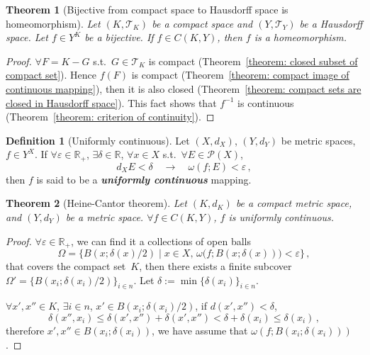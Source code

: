 \documentclass[openany]{book}
\newcommand*{\indexbf}[1]{\emph{\textbf{#1}}\index{#1}} %
\theoremstyle{plain}
\newtheorem{theorem}{Theorem}[section] %
\theoremstyle{definition}
\newtheorem{definition}{Definition}[section] %
\begin{document}
\begin{theorem}[Bijective from compact space to Hausdorff space is homeomorphism]
		\label{theorem: bijective from compact space to Hausdorff space is homeomorphism}
	Let $(K, \mathscr T_K)$ be a compact space and $(Y, \mathscr T_Y)$ be a Hausdorff space. 
	Let $f \in Y^K$ be a bijective.
	If $f \in C(K, Y)$, then $f$ is a homeomorphism.
\end{theorem}
\begin{proof}
	$\forall F = K - G$ s.t.\ $G \in \mathscr T_K$ is compact (Theorem~\ref{theorem: closed subset of compact set}). 
	Hence $f(F)$ is compact (Theorem~\ref{theorem: compact image of continuous mapping}), then it is also closed
	(Theorem~\ref{theorem: compact sets are closed in Hausdorff space}). 
	This fact shows that $f^{-1}$ is continuous (Theorem~\ref{theorem: criterion of continuity}).
\end{proof}

\begin{definition}[Uniformly continuous]
	Let $(X, d_X)$, $(Y, d_Y)$ be metric spaces, $f \in Y^X$.
	If $\forall \varepsilon \in \mathbb R_+$, $\exists \delta \in \mathbb R$, $\forall x \in X$ s.t.\ $\forall E \in \mathscr P(X)$, 
	\begin{equation*}
		d_X E < \delta 
		\quad \to \quad
		\omega(f; E) < \varepsilon\,,
	\end{equation*}
	then $f$ is said to be a \indexbf{uniformly continuous} mapping.
\end{definition}

\begin{theorem}[Heine-Cantor theorem]
	\label{theorem: Heine-Cantor}
	Let $(K, d_K)$ be a compact metric space, and $(Y, d_Y)$ be a metric space.
	$\forall f \in C(K, Y)$, $f$ is uniformly continuous.
\end{theorem}
\begin{proof}
	$\forall \varepsilon \in \mathbb R_+$, we can find it a collections of open balls
	\begin{equation*}
		\varOmega = \big\{B(x; \delta(x)/2) \mid
			 x \in X,\, \omega\big(f; B(x; \delta(x))\big) < \varepsilon \big\}\,,
	\end{equation*}
	that covers the compact set~$K$, then there exists a finite subcover $\varOmega' = \big\{B(x_i; \delta(x_i)/2)\big\}_{i \in n}$. Let $\delta := \min \{\delta(x_i)\}_{i \in n}$.
	
	$\forall x', x'' \in K$, $\exists i \in n$, $x' \in B(x_i; \delta(x_i)/2)$, if $d(x', x'') < \delta$, 
	\begin{equation*}
		\delta(x'', x_i) \leq \delta(x', x'') + \delta(x', x'') < \delta + \delta(x_i) \leq \delta(x_i)\,,
	\end{equation*}
	therefore $x', x'' \in B(x_i; \delta(x_i))$, we have assume that $\omega(f; B(x_i; \delta(x_i)))$.
\end{proof}
\end{document}
